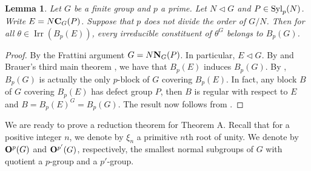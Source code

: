 \documentclass[a4paper,12pt,leqno]{amsart}
\def\irr#1{{\Irr}(#1)}
\def\syl#1#2{{\rm Syl}_{#1}(#2)}
\def\nor{\triangleleft}
\def\norm#1#2{{\bf N}_{#1}(#2)}
\def\cent#1#2{{\bf C}_{#1}(#2)}
\newcommand{\6}{^}
\newcommand{\Irr}{\operatorname{Irr}}
\newtheorem{lem}[subsection]{Lemma}
\theoremstyle{definition}
\theoremstyle{definition}
\theoremstyle{definition}
\theoremstyle{definition}
\theoremstyle{definition}
\begin{document}
\begin{lem}\label{lem:covering} 
Let $G$ be a finite group and $p$ a prime. 
Let $N \nor G$ and $P \in \syl p N$. Write $E=N \cent G P$. Suppose that $p$ does not divide the order of $G/N$. Then
for all $\theta \in \irr{B_p(E)}$, every irreducible constituent of $\theta^G$ belongs to $B_p(G)$.
\end{lem}
\begin{proof} 
By the Frattini argument $G=N \norm G P$. In particular, $E\nor G$.
By \cite[Theorem 4.14 and Problem 4.2]{Nav98} and Brauer's third main theorem \cite[Theorem 6.7]{Nav98}, we have that $B_p(E)$ induces $B_p(G)$. By \cite[Theorem 9.19, Lemma 9.20 and Theorem 9.26]{Nav98}, $B_p(G)$ is actually the only $p$-block of $G$ covering $B_p(E)$.  In fact, any block $B$ of $G$ covering $B_p(E)$ has defect group $P$, then $B$ is regular with respect to $E$ and $B=B_p(E)^G=B_p(G)$. The result now follows from \cite[Theorem 9.2]{Nav98}.
\end{proof}

We are ready to prove a reduction theorem for Theorem A. Recall that for a positive integer $n$, we denote by $\xi_n$ a primitive $n$th root of unity. We denote by ${\bf O}^p(G)$ and ${\bf O}^{p'}(G)$, respectively, the smallest normal subgroups
 of $G$ with quotient a $p$-group and a $p'$-group.
\end{document}
